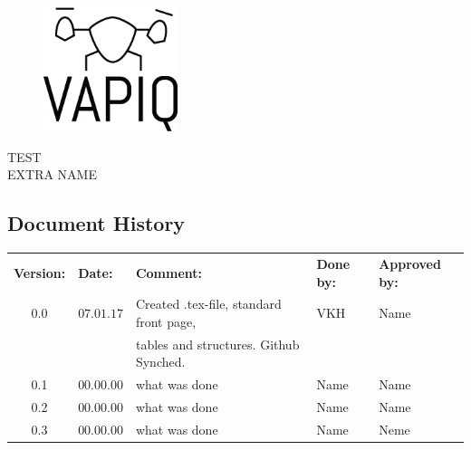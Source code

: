 \documentclass{article}
\author{Tomas Lyngroth \\ Aleksander Holthe \\ Vanja Katinka Halvorsen \\ Stian Fredriksen \\ Kent Kjeldaas \\ Katrine Sundal Haune}
\makeatletter
\let\vapiqteam\@author
\makeatother
\begin{document}
\begin{titlepage}
    \centering
    \pagecolor{gainsboro}
	\\[3.0 cm]
    \begin{figure}[h]
        \centering
        \includegraphics[width = 0.35\textwidth]{VAPIQ-PICTURES//Logo2_Tilted.png}
        \\[2.0 cm] 
    \end{figure}                              
    \textsc{\Huge TEST}  
    \\[1 cm]
    \textsc{\Large EXTRA NAME}   
    \\[3.0 cm]
	\large \vapiqteam      
\end{titlepage}
\pagecolor{white}


\begin{center}
\section*{\textbf{Document History}}
\begin{tabular}{cllll}
\rowcolor{cadetgrey}
\textbf{Version:}    &\textbf{Date:} 	 &\textbf{Comment:}    &\textbf{Done by:}   &\textbf{Approved by:}  \\

0.0       & $07.01.17$   & Created .tex-file, standard front page, & VKH  & Name \\
          &              & tables and structures. Github Synched.    &     & \\\rowcolor{gainsboro}
0.1       & $00.00.00$   & what was done  & Name    & Name          \\
0.2       & $00.00.00$   & what was done  & Name    & Name          \\ \rowcolor{gainsboro}
0.3       & $00.00.00$   & what was done  & Name    & Neme          \\
\end{tabular}                                                                   
\end{center}
\end{document}
